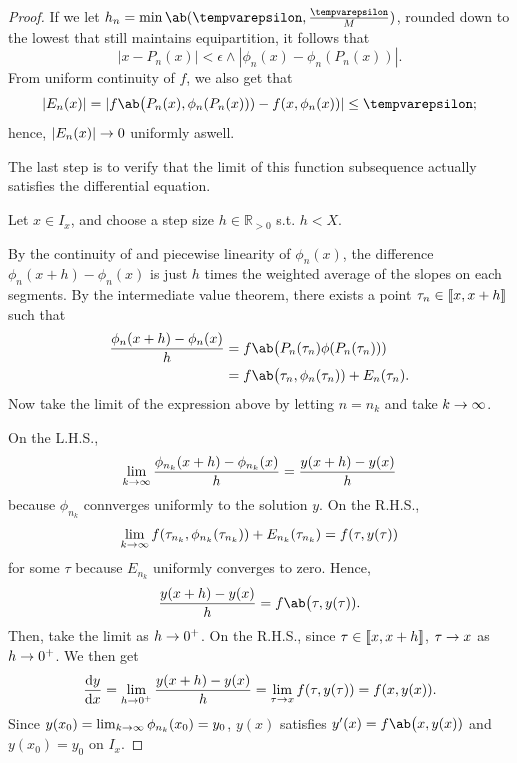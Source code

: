 \begin{proof}
  If we let \(h_n = \min\ab(\epsilon, \frac{\epsilon}{M})\), rounded down to the lowest
  that still maintains equipartition, it follows that
  \begin{equation}
    |x - P_n(x)| < \epsilon \land |\phi_n(x) - \phi_n(P_n(x))|.
  \end{equation}
  From uniform continuity of \(f\), we also get that
  \begin{equation}
    |E_n(x)| = |f\ab\big(P_n(x), \phi_n(P_n(x))) - f(x, \phi_n(x))| \leq \epsilon;
  \end{equation}
  hence, \(|E_n(x)| \rightarrow 0\) uniformly aswell.

  The last step is to verify that the limit of this function subsequence actually
  satisfies the differential equation.

  Let \(x \in I_x\), and choose a step size \(h \in \mathbb{R}_{>0}\) s.t. \(h < X\).

  By the continuity of and piecewise linearity of \(\phi_n(x)\), the difference
  \(\phi_n(x + h) - \phi_n(x)\) is just \(h\) times the weighted average of the
  slopes on each segments. By the intermediate value theorem, there exists a point
  \(\tau_n \in \cintv{x, x + h}\) such that
  \begin{align}
    \frac{\phi_n(x + h) - \phi_n(x)}{h} & = f\ab\big(P_n(\tau_n) \phi(P_n(\tau_n)))         \\
                                        & = f\ab\big(\tau_n, \phi_n(\tau_n)) + E_n(\tau_n).
  \end{align}
  Now take the limit of the expression above by letting \(n = n_k\) and take \(k \rightarrow \infty\).

  On the L.H.S.,
  \begin{equation}
    \lim_{k \rightarrow \infty} \frac{\phi_{n_k}(x + h) - \phi_{n_k}(x)}{h} = \frac{y(x + h) - y(x)}{h}
  \end{equation}
  because \(\phi_{n_k}\) connverges uniformly to the solution \(y\). On the R.H.S.,
  \begin{equation}
    \lim_{k \rightarrow \infty} f(\tau_{n_k}, \phi_{n_k}(\tau_{n_k})) + E_{n_k}(\tau_{n_k}) = f(\tau, y(\tau))
  \end{equation}
  for some \(\tau\) because \(E_{n_k}\) uniformly converges to zero. Hence,
  \begin{equation}
    \frac{y(x + h) - y(x)}{h} = f\ab\big(\tau, y(\tau)).
  \end{equation}
  Then, take the limit as \(h \rightarrow 0^+\). On the R.H.S., since \(\tau \in \cintv{x, x + h}\),
  \(\tau \rightarrow x\) as \(h \rightarrow 0^+\). We then get
  \begin{equation}
    \odv{y}{x} = \lim_{h \appr 0^+}\frac{y(x + h) - y(x)}{h}
               = \lim_{\tau \appr x} f(\tau, y(\tau))
               = f(x, y(x)).
  \end{equation}
  Since \(y(x_0) = \lim_{k \rightarrow \infty} \phi_{n_k}(x_0) = y_0\), \(y(x)\) satisfies
  \(y'(x) = f\ab\big(x, y(x))\) and \(y(x_0) = y_0\) on \(I_x\).


\end{proof}
